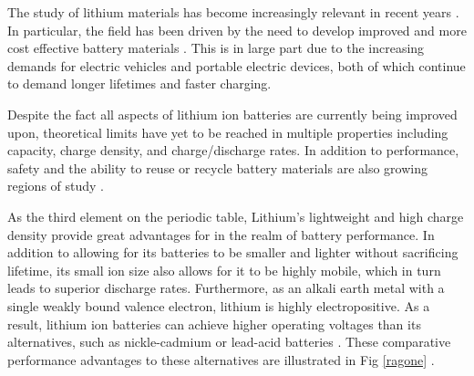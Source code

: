 



 

The study of lithium materials has become increasingly relevant in recent years \cite{nitta_li-ion_2015}.  In particular, the field has been driven by the need to develop improved  and more cost effective battery materials \cite{nitta_li-ion_2015}.  %
This is in large part due to the increasing demands for electric vehicles and portable electric devices, both of which continue to demand longer lifetimes and faster charging.



Despite the fact all aspects of lithium ion batteries are currently being improved upon, theoretical limits have yet to be reached in multiple properties including capacity, charge density, and charge/discharge rates.  In  addition to performance, safety and the ability to reuse or recycle battery materials are also growing regions of study \cite{gaines_future_2014, doughty_general_2012, balakrishnan_safety_2006}.  %

As the third element on the periodic table, Lithium's lightweight and high charge density provide great advantages for in the realm of battery performance. In addition to allowing for its batteries to be smaller and lighter without sacrificing lifetime, its small ion size also allows for it to be highly mobile, which in turn leads to superior discharge rates. Furthermore, as an alkali earth metal with a single weakly bound valence electron, lithium is highly electropositive.  As a result, lithium ion batteries can achieve higher operating voltages than its alternatives, such as nickle-cadmium or lead-acid batteries \cite{etacheri_challenges_2011}.  These comparative performance advantages to these alternatives are illustrated in Fig \ref{ragone} \cite{etacheri_challenges_2011}.\\


